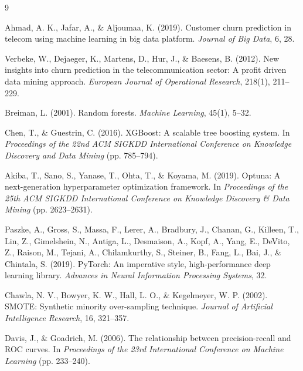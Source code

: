 \documentclass{article}
\begin{document}
\begin{thebibliography}{9}

Ahmad, A. K., Jafar, A., \& Aljoumaa, K. (2019). Customer churn prediction in telecom using machine learning in big data platform. \textit{Journal of Big Data}, 6, 28.

Verbeke, W., Dejaeger, K., Martens, D., Hur, J., \& Baesens, B. (2012). New insights into churn prediction in the telecommunication sector: A profit driven data mining approach. \textit{European Journal of Operational Research}, 218(1), 211--229.

Breiman, L. (2001). Random forests. \textit{Machine Learning}, 45(1), 5--32.

Chen, T., \& Guestrin, C. (2016). XGBoost: A scalable tree boosting system. In \textit{Proceedings of the 22nd ACM SIGKDD International Conference on Knowledge Discovery and Data Mining} (pp. 785--794).

Akiba, T., Sano, S., Yanase, T., Ohta, T., \& Koyama, M. (2019). Optuna: A next-generation hyperparameter optimization framework. In \textit{Proceedings of the 25th ACM SIGKDD International Conference on Knowledge Discovery \& Data Mining} (pp. 2623--2631).

Paszke, A., Gross, S., Massa, F., Lerer, A., Bradbury, J., Chanan, G., Killeen, T., Lin, Z., Gimelshein, N., Antiga, L., Desmaison, A., Kopf, A., Yang, E., DeVito, Z., Raison, M., Tejani, A., Chilamkurthy, S., Steiner, B., Fang, L., Bai, J., \& Chintala, S. (2019). PyTorch: An imperative style, high-performance deep learning library. \textit{Advances in Neural Information Processing Systems}, 32.

Chawla, N. V., Bowyer, K. W., Hall, L. O., \& Kegelmeyer, W. P. (2002). SMOTE: Synthetic minority over-sampling technique. \textit{Journal of Artificial Intelligence Research}, 16, 321--357.

Davis, J., \& Goadrich, M. (2006). The relationship between precision-recall and ROC curves. In \textit{Proceedings of the 23rd International Conference on Machine Learning} (pp. 233--240).

\end{thebibliography}
\end{document}

